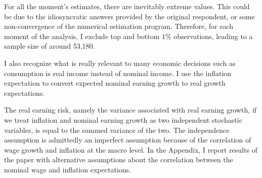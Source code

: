 For all the moment's estimates, there are inevitably extreme values.
This could be due to the idiosyncratic answers provided by the original
respondent, or some non-convergence of the numerical estimation program.
Therefore, for each moment of the analysis, I exclude top and bottom
\(1\%\) observations, leading to a sample size of around 53,180.

I also recognize what is really relevant to many economic decisions such
as consumption is real income instead of nominal income. I use the inflation expectation to convert expected nominal earning growth to real
growth expectations. 

The real earning risk, namely the variance associated with real earning growth, if we treat inflation
and nominal earning growth as two independent stochastic variables, is
equal to the summed variance of the two. The independence assumption is
admittedly an imperfect assumption because of the correlation of wage
growth and inflation at the macro level. In the Appendix, I report results of the paper with alternative assumptions about the correlation between the nominal wage and inflation expectations.
